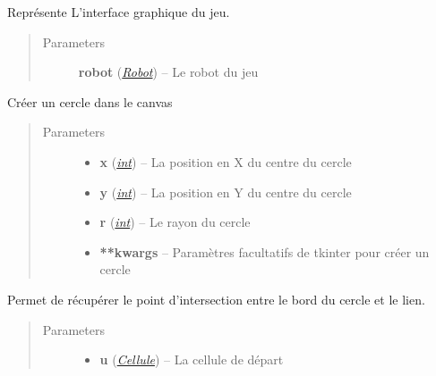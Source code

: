 \documentclass[letterpaper,10pt,english]{sphinxmanual}
\begin{document}
\begin{fulllineitems}
\label{index:Graphique.Graphique}
Représente L'interface graphique du jeu.
\begin{quote}\begin{description}
\item[{Parameters}] \leavevmode
\textbf{robot} ({\hyperref[index:module-Robot]{\emph{Robot}}}) -- Le robot du jeu

\end{description}\end{quote}

\begin{fulllineitems}
\label{index:Graphique.Graphique.create_circle}
Créer un cercle dans le canvas
\begin{quote}\begin{description}
\item[{Parameters}] \leavevmode\begin{itemize}
\item {} 
\textbf{x} (\href{http://docs.python.org/library/functions.html\#int}{\emph{int}}) -- La position en X du centre du cercle

\item {} 
\textbf{y} (\href{http://docs.python.org/library/functions.html\#int}{\emph{int}}) -- La position en Y du centre du cercle

\item {} 
\textbf{r} (\href{http://docs.python.org/library/functions.html\#int}{\emph{int}}) -- Le rayon du cercle

\item {} 
\textbf{**kwargs} -- 
Paramètres facultatifs de tkinter pour créer un cercle


\end{itemize}

\end{description}\end{quote}

\end{fulllineitems}


\begin{fulllineitems}
\label{index:Graphique.Graphique.decalage_centre_cercle}
Permet de récupérer le point d'intersection entre le bord du cercle et le lien.
\begin{quote}\begin{description}
\item[{Parameters}] \leavevmode\begin{itemize}
\item {} 
\textbf{u} ({\hyperref[index:module-Cellule]{\emph{Cellule}}}) -- La cellule de départ


\end{itemize}
\end{description}
\end{quote}
\end{fulllineitems}
\end{fulllineitems}
\end{document}
